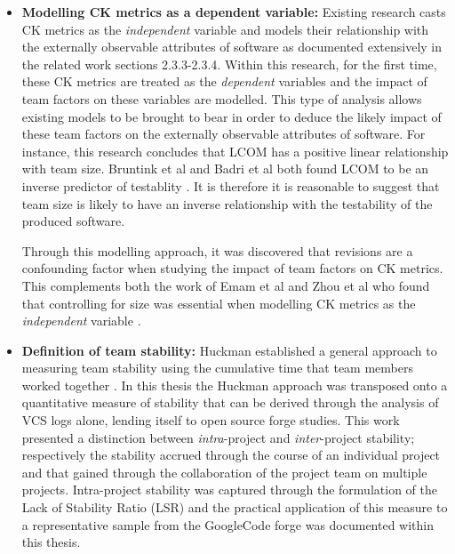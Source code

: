 \begin{itemize}
\item  \textbf{Modelling CK metrics as a dependent variable: } Existing research casts CK metrics as the \textit{independent} variable and models their relationship with the externally observable attributes of software as documented extensively in the related work sections 2.3.3-2.3.4. Within this research, for the first time, these CK metrics are treated as the \textit{dependent} variables and the impact of team factors on these variables are modelled. This type of analysis allows existing models to be brought to bear in order to deduce the likely impact of these team factors on the externally observable attributes of software. For instance, this research concludes that LCOM has a positive linear relationship with team size. Bruntink et al and Badri et al both found LCOM to be an inverse predictor of testablity \citep{bruntink2006empirical} \citep{badri2011empirical}. It is therefore it is reasonable to suggest that team size is likely to have an inverse relationship with the testability of the produced software. 

Through this modelling approach, it was discovered that revisions are a confounding factor when studying the impact of team factors on CK metrics. This complements both the work of Emam et al and Zhou et al who found that controlling for size was essential when modelling CK metrics as the \textit{independent} variable  \citep{el2001prediction} \citep{zhou2006empirical}.

\item  \textbf{Definition of team stability: } Huckman established a general approach to measuring team stability using the cumulative time that team members worked together \citep{huckman2009team}. In this thesis the Huckman approach was transposed onto a quantitative measure of stability that can be derived through the analysis of VCS logs alone, lending itself to open source forge studies. This work presented a distinction between \textit{intra}-project  and \textit{inter}-project stability; respectively the stability accrued through the course of an individual project and that gained through the collaboration of the project team on multiple projects. Intra-project stability was captured through the formulation of  the Lack of Stability Ratio (LSR) and the practical application of this measure to a representative sample from the GoogleCode forge was documented within this thesis.
\end{itemize}

